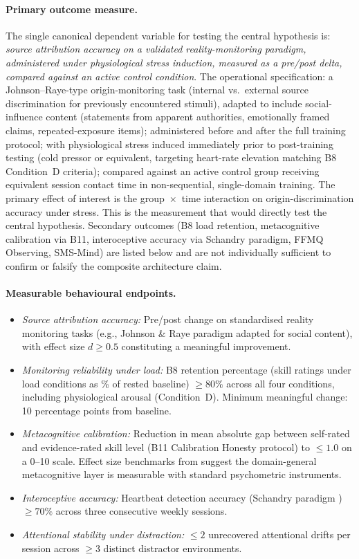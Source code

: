 \documentclass[12pt, a4paper]{article}
\begin{document}
\paragraph{Primary outcome measure.}
The single canonical dependent variable for testing the central hypothesis is:
\emph{source attribution accuracy on a validated reality-monitoring paradigm,
administered under physiological stress induction, measured as a pre/post delta,
compared against an active control condition}. The operational specification:
a Johnson--Raye-type origin-monitoring task (internal vs.\ external source
discrimination for previously encountered stimuli), adapted to include
social-influence content (statements from apparent authorities, emotionally
framed claims, repeated-exposure items); administered before and after the full
training protocol; with physiological stress induced immediately prior to
post-training testing (cold pressor or equivalent, targeting heart-rate elevation
matching B8 Condition~D criteria); compared against an active control group
receiving equivalent session contact time in non-sequential, single-domain
training. The primary effect of interest is the group~$\times$~time interaction
on origin-discrimination accuracy under stress. This is the measurement that
would directly test the central hypothesis. Secondary outcomes (B8 load retention,
metacognitive calibration via B11, interoceptive accuracy via Schandry paradigm,
FFMQ Observing, SMS-Mind) are listed below and are not individually sufficient to
confirm or falsify the composite architecture claim.

\paragraph{Measurable behavioural endpoints.}
\begin{itemize}[leftmargin=2em]
\item \emph{Source attribution accuracy:} Pre/post change on standardised reality
monitoring tasks (e.g., Johnson \& Raye paradigm adapted for social content), with
effect size $d \geq 0.5$ constituting a meaningful improvement.
\item \emph{Monitoring reliability under load:} B8 retention percentage (skill ratings
under load conditions as \% of rested baseline) $\geq 80\%$ across all four conditions,
including physiological arousal (Condition~D). Minimum meaningful change: 10 percentage
points from baseline.
\item \emph{Metacognitive calibration:} Reduction in mean absolute gap between
self-rated and evidence-rated skill level (B11 Calibration Honesty protocol) to
$\leq 1.0$ on a 0--10 scale. Effect size benchmarks from \citet{molenberghs2016}
suggest the domain-general metacognitive layer is measurable with standard psychometric
instruments.
\item \emph{Interoceptive accuracy:} Heartbeat detection accuracy (Schandry paradigm
\citep{schandry1981}) $\geq 70\%$ across three consecutive weekly sessions.
\item \emph{Attentional stability under distraction:} $\leq 2$ unrecovered attentional
drifts per session across $\geq 3$ distinct distractor environments.
\end{itemize}
\end{document}
